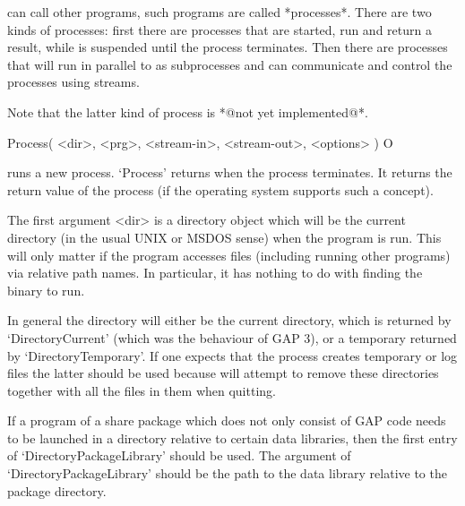 


{\GAP}  can  call other programs,  such  programs are called *processes*.
There are  two  kinds of processes:  first there  are  processes that are
started, run and  return a result,  while  {\GAP} is suspended  until the
process  terminates.  Then there are  processes that will run in parallel
to {\GAP} as  subprocesses  and {\GAP} can  communicate and   control the
processes using streams.

Note that the latter kind of process is *@not yet implemented@*.


\>Process( <dir>, <prg>, <stream-in>, <stream-out>, <options> ) O

runs  a new process.  `Process' returns  when the process terminates.  It
returns the return value of the process (if the operating system supports
such a concept).

The first argument <dir> is a directory object which  will be the current
directory (in the usual UNIX  or MSDOS sense) when   the program is  run.
This will  only matter if  the program accesses  files (including running
other programs)  via relative path names.   In particular, it has nothing
to do with finding the binary to run.

In general the  directory will either  be the current directory, which is
returned by `DirectoryCurrent'  (which was the behaviour  of GAP 3), or a
temporary returned  by  `DirectoryTemporary'.  If  one  expects  that the
process creates temporary or log files the latter  should be used because
{\GAP} will attempt  to remove these  directories  together with all  the
files in them when quitting.

If a program of a share package which does not only consist of {GAP} code
needs  to be  launched  in a directory
relative  to  certain  data    libraries,   then  the first     entry  of
`DirectoryPackageLibrary'    should  be   used.     The     argument   of
`DirectoryPackageLibrary' should be the path to the data library relative
to the package directory.

